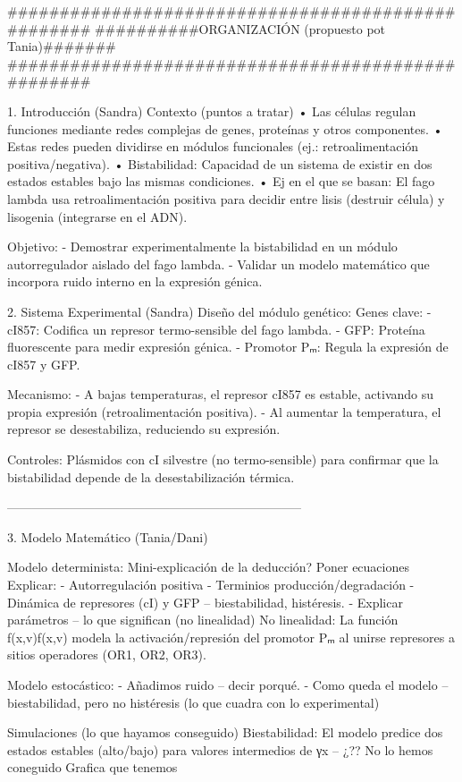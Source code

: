 ###################################################
##########ORGANIZACIÓN (propuesto pot Tania)#######
###################################################

1. Introducción (Sandra)
Contexto (puntos a tratar)
•	Las células regulan funciones mediante redes complejas de genes, proteínas y otros componentes.
•	Estas redes pueden dividirse en módulos funcionales (ej.: retroalimentación positiva/negativa).
•	Bistabilidad: Capacidad de un sistema de existir en dos estados estables bajo las mismas condiciones.
•	Ej en el que se basan: El fago lambda usa retroalimentación positiva para decidir entre lisis (destruir célula) y lisogenia (integrarse en el ADN).

Objetivo:
- Demostrar experimentalmente la bistabilidad en un módulo autorregulador aislado del fago lambda.
- Validar un modelo matemático que incorpora ruido interno en la expresión génica.

2. Sistema Experimental (Sandra)
Diseño del módulo genético:
Genes clave:
- cI857: Codifica un represor termo-sensible del fago lambda.
- GFP: Proteína fluorescente para medir expresión génica.
- Promotor Pₘ: Regula la expresión de cI857 y GFP.

Mecanismo:
- A bajas temperaturas, el represor cI857 es estable, activando su propia expresión (retroalimentación positiva).
- Al aumentar la temperatura, el represor se desestabiliza, reduciendo su expresión.

Controles: Plásmidos con cI silvestre (no termo-sensible) para confirmar que la bistabilidad depende de la desestabilización térmica.

-----------------------------------------------------------------------

3. Modelo Matemático (Tania/Dani)

Modelo determinista:
Mini-explicación de la deducción?
Poner ecuaciones
Explicar:
-	Autorregulación positiva
-	Terminios producción/degradación
-	Dinámica de represores (cI) y GFP – biestabilidad, histéresis.
-	Explicar parámetros – lo que significan (no linealidad)
No linealidad: La función f(x,v)f(x,v) modela la activación/represión del promotor Pₘ al unirse represores a sitios operadores (OR1, OR2, OR3).

Modelo estocástico:
-	Añadimos ruido – decir porqué. 
-	Como queda el modelo – biestabilidad, pero no histéresis (lo que cuadra con lo experimental)

Simulaciones (lo que hayamos conseguido)
Biestabilidad: El modelo predice dos estados estables (alto/bajo) para valores intermedios de γx – ¿?? No lo hemos coneguido
Grafica que tenemos

